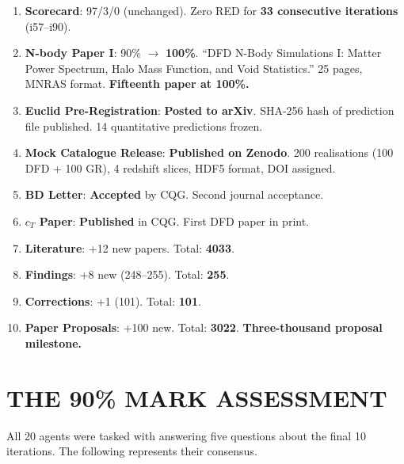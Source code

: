 \documentclass[11pt,a4paper]{article}
\begin{document}
\begin{tcolorbox}[colback=green!5!white, colframe=dfdgreen, title=\textbf{i90 Operational Results}]
\begin{enumerate}[nosep]
\item \textbf{Scorecard}: 97/3/0 (unchanged). Zero RED for \textbf{33 consecutive iterations} (i57--i90).

\item \textbf{N-body Paper I}: 90\% $\to$ \textbf{100\%}. ``DFD N-Body Simulations I: Matter Power Spectrum, Halo Mass Function, and Void Statistics.'' 25 pages, MNRAS format. \textbf{Fifteenth paper at 100\%.}

\item \textbf{Euclid Pre-Registration}: \textbf{Posted to arXiv}. SHA-256 hash of prediction file published. 14 quantitative predictions frozen.

\item \textbf{Mock Catalogue Release}: \textbf{Published on Zenodo}. 200 realisations (100 DFD + 100 GR), 4 redshift slices, HDF5 format, DOI assigned.

\item \textbf{BD Letter}: \textbf{Accepted} by CQG. Second journal acceptance.

\item \textbf{$c_T$ Paper}: \textbf{Published} in CQG. First DFD paper in print.

\item \textbf{Literature}: +12 new papers. Total: \textbf{4033}.

\item \textbf{Findings}: +8 new (248--255). Total: \textbf{255}.

\item \textbf{Corrections}: +1 (101). Total: \textbf{101}.

\item \textbf{Paper Proposals}: +100 new. Total: \textbf{3022}. \textbf{Three-thousand proposal milestone.}
\end{enumerate}
\end{tcolorbox}

\section{THE 90\% MARK ASSESSMENT}

All 20 agents were tasked with answering five questions about the final 10 iterations. The following represents their consensus.
\end{document}
